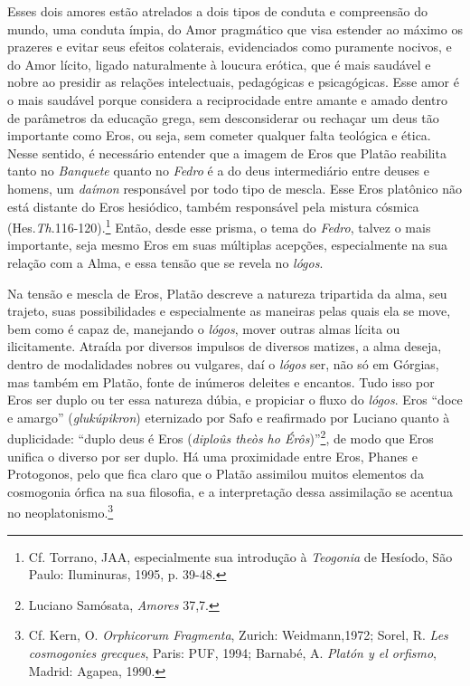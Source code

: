 Esses dois amores estão atrelados a dois tipos de conduta e compreensão
do mundo, uma conduta ímpia, do Amor pragmático que visa estender ao
máximo os prazeres e evitar seus efeitos colaterais, evidenciados como
puramente nocivos, e do Amor lícito, ligado naturalmente à loucura
erótica, que é mais saudável e nobre ao presidir as relações
intelectuais, pedagógicas e psicagógicas. Esse amor é o mais saudável
porque considera a reciprocidade entre amante e amado dentro de
parâmetros da educação grega, sem desconsiderar ou rechaçar um deus tão
importante como Eros, ou seja, sem cometer qualquer falta teológica e
ética. Nesse sentido, é necessário entender que a imagem de Eros que
Platão reabilita tanto no \emph{Banquete} quanto no \emph{Fedro} é a do
deus intermediário entre deuses e homens, um \emph{daímon} responsável
por todo tipo de mescla. Esse Eros platônico não está distante do Eros
hesiódico, também responsável pela mistura cósmica
(Hes.\emph{Th}.116-120).\footnote{Cf. Torrano, JAA, especialmente sua
  introdução à \emph{Teogonia} de Hesíodo, São Paulo: Iluminuras, 1995,
  p. 39-48.} Então, desde esse prisma, o tema do \emph{Fedro}, talvez o
mais importante, seja mesmo Eros em suas múltiplas acepções,
especialmente na sua relação com a Alma, e essa tensão que se revela no
\emph{lógos}.

Na tensão e mescla de Eros, Platão descreve a natureza tripartida da
alma, seu trajeto, suas possibilidades e especialmente as maneiras pelas
quais ela se move, bem como é capaz de, manejando o \emph{lógos}, mover
outras almas lícita ou ilicitamente. Atraída por diversos impulsos de
diversos matizes, a alma deseja, dentro de modalidades nobres ou
vulgares, daí o \emph{lógos} ser, não só em Górgias, mas também em
Platão, fonte de inúmeros deleites e encantos. Tudo isso por Eros ser
duplo ou ter essa natureza dúbia, e propiciar o fluxo do \emph{lógos}.
Eros ``doce e amargo'' (\emph{glukúpikron}) eternizado por Safo e
reafirmado por Luciano quanto à duplicidade: ``duplo deus é Eros
(\emph{diploûs theòs ho Érôs})''\footnote{Luciano Samósata,
  \emph{Amores} 37,7.}, de modo que Eros unifica o diverso por ser
duplo. Há uma proximidade entre Eros, Phanes e Protogonos, pelo que fica
claro que o Platão assimilou muitos elementos da cosmogonia órfica na
sua filosofia, e a interpretação dessa assimilação se acentua no
neoplatonismo.\footnote{Cf. Kern, O. \emph{Orphicorum Fragmenta},
  Zurich: Weidmann,1972; Sorel, R. \emph{Les cosmogonies grecques},
  Paris: PUF, 1994; Barnabé, A. \emph{Platón y el orfismo}, Madrid:
  Agapea, 1990.}

